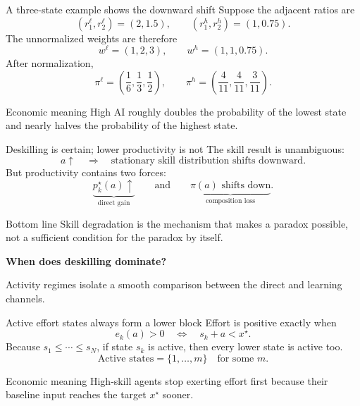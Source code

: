 \documentclass[aspectratio=169,11pt]{beamer}
\newcommand{\econmeaning}[1]{%
  \begin{block}{Economic meaning}
  #1
  \end{block}}
\newcommand{\bottomline}[1]{%
  \begin{alertblock}{Bottom line}
  #1
  \end{alertblock}}
\begin{document}
\begin{frame}{A three-state example shows the downward shift}
Suppose the adjacent ratios are
\[
(r_1^\ell,r_2^\ell)=(2,1.5),
\qquad
(r_1^h,r_2^h)=(1,0.75).
\]
The unnormalized weights are therefore
\[
w^\ell=(1,2,3),
\qquad
w^h=(1,1,0.75).
\]
After normalization,
\[
\pi^\ell=\left(\frac16,\frac13,\frac12\right),
\qquad
\pi^h=\left(\frac4{11},\frac4{11},\frac3{11}\right).
\]
\econmeaning{High AI roughly doubles the probability of the lowest state and nearly halves the probability of the highest state.}
\end{frame}

\begin{frame}{Deskilling is certain; lower productivity is not}
The skill result is unambiguous:
\[
a\uparrow
\quad\Longrightarrow\quad
\text{stationary skill distribution shifts downward}.
\]
But productivity contains two forces:
\[
\underbrace{p_k^\star(a)\uparrow}_{\text{direct gain}}
\qquad\text{and}\qquad
\underbrace{\pi(a)\text{ shifts down}}_{\text{composition loss}}.
\]
\bottomline{Skill degradation is the mechanism that makes a paradox possible, not a sufficient condition for the paradox by itself.}
\end{frame}


\begin{frame}[plain]
  \vspace{23mm}
  {\color{white}\Huge\bfseries When does deskilling dominate?\par}
  \vspace{8mm}
  {\color{white!82}\Large Activity regimes isolate a smooth comparison between the direct and learning channels.\par}
\end{frame}

\begin{frame}{Active effort states always form a lower block}
Effort is positive exactly when
\[
e_k(a)>0
\quad\Longleftrightarrow\quad
s_k+a<x^\star.
\]
Because $s_1\le\cdots\le s_N$, if state $s_k$ is active, then every lower state is active too.
\[
\boxed{\text{Active states}=\{1,\ldots,m\}
\quad\text{for some }m.}
\]
\econmeaning{High-skill agents stop exerting effort first because their baseline input reaches the target $x^\star$ sooner.}
\end{frame}
\end{document}
